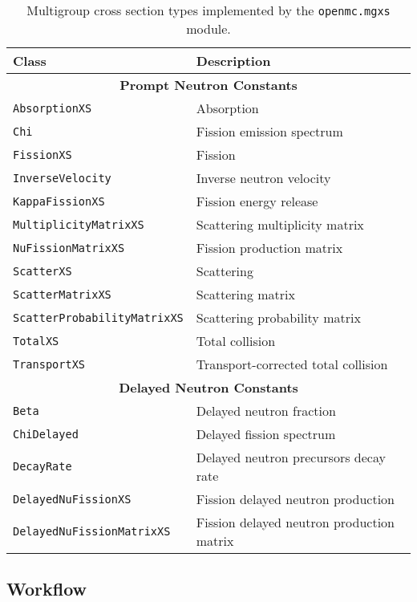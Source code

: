 \begin{table}[h!]
  \centering
  \caption{Multigroup cross section types implemented by the \texttt{openmc.mgxs} module.}
  \small
  \label{tab:mgxs-types}
  \vspace{6pt}
  \begin{tabular}{l l}
  \toprule
  \textbf{Class} &
  \textbf{Description} \\
  \midrule
  \multicolumn{2}{c}{\bf Prompt Neutron Constants} \\
  \midrule
  \texttt{AbsorptionXS} & Absorption \\
  \texttt{Chi} & Fission emission spectrum \\
  \texttt{FissionXS} & Fission \\
  \texttt{InverseVelocity} & Inverse neutron velocity \\
  \texttt{KappaFissionXS} & Fission energy release \\
  \texttt{MultiplicityMatrixXS} & Scattering multiplicity matrix \\
  \texttt{NuFissionMatrixXS} & Fission production matrix \\
  \texttt{ScatterXS} & Scattering \\
  \texttt{ScatterMatrixXS} & Scattering matrix \\
  \texttt{ScatterProbabilityMatrixXS} & Scattering probability matrix \\
  \texttt{TotalXS} & Total collision \\
  \texttt{TransportXS} & Transport-corrected total collision \\
  \midrule
  \multicolumn{2}{c}{\bf Delayed Neutron Constants} \\
  \midrule
  \texttt{Beta} & Delayed neutron fraction \\
  \texttt{ChiDelayed} & Delayed fission spectrum \\
  \texttt{DecayRate} & Delayed neutron precursors decay rate \\
  \texttt{DelayedNuFissionXS} & Fission delayed neutron production \\
  \texttt{DelayedNuFissionMatrixXS} & Fission delayed neutron production matrix \\
  \bottomrule
\end{tabular}
\end{table}


\subsection{Workflow}
\label{subsec:workflow}

